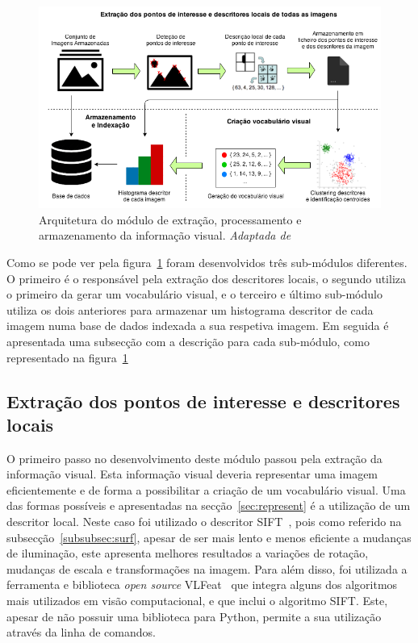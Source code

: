 \begin{figure}[h]
\centering
\includegraphics[width=0.95\linewidth]{./figures/infovisual}
\caption{Arquitetura do módulo de extração, processamento e armazenamento da informação visual. \textit{Adaptada de}~\cite{Bueno2011}}
\label{fig:infovisual}
\end{figure}

Como se pode ver pela figura~\ref{fig:infovisual} foram desenvolvidos três sub-módulos diferentes. O primeiro é o responsável pela extração dos descritores locais, o segundo utiliza o primeiro da gerar um vocabulário visual, e o terceiro e último sub-módulo utiliza os dois anteriores para armazenar um histograma descritor de cada imagem numa base de dados indexada a sua respetiva imagem. 
Em seguida é apresentada uma subsecção com a descrição para cada sub-módulo, como representado na figura~\ref{fig:infovisual}

\subsection{Extração dos pontos de interesse e descritores locais}

O primeiro passo no desenvolvimento deste módulo passou pela extração da informação visual. Esta informação visual deveria representar uma imagem eficientemente e de forma a possibilitar a criação de um vocabulário visual. Uma das formas possíveis e apresentadas na secção~\ref{sec:represent} é a utilização de um descritor local. Neste caso foi utilizado o descritor SIFT~\cite{Lowe1999, Lowe2004}, pois como referido na subsecção~\ref{subsubsec:surf}, apesar de ser mais lento e menos eficiente a mudanças de iluminação, este apresenta melhores resultados a variações de rotação, mudanças de escala e transformações na imagem. Para além disso, foi utilizada a ferramenta e biblioteca \textit{open source} VLFeat~\cite{vedaldi08vlfeat} que integra alguns dos algoritmos mais utilizados em visão computacional, e que inclui o algoritmo SIFT. Este, apesar de não possuir uma biblioteca para Python, permite a sua utilização através da linha de comandos.

